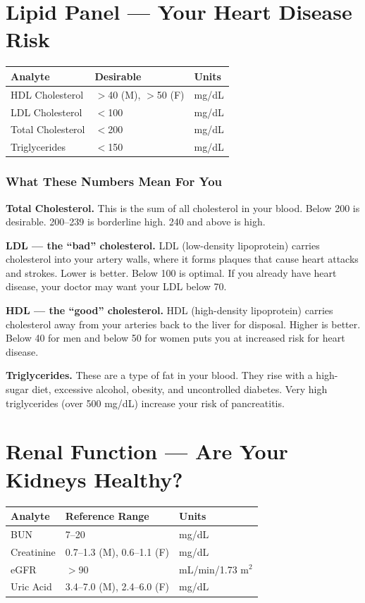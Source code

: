 \clearpage
\section{Lipid Panel --- Your Heart Disease Risk}

\begin{longtable}{@{}lll@{}}
\toprule
\textbf{Analyte} & \textbf{Desirable} & \textbf{Units} \\
\midrule
HDL Cholesterol & $>$40 (M), $>$50 (F) & mg/dL \\
LDL Cholesterol & $<$100 & mg/dL \\
Total Cholesterol & $<$200 & mg/dL \\
Triglycerides & $<$150 & mg/dL \\
\bottomrule
\end{longtable}

\subsubsection{What These Numbers Mean For You}

\textbf{Total Cholesterol.} This is the sum of all cholesterol in your blood. Below 200 is desirable. 200--239 is borderline high. 240 and above is high.

\textbf{LDL --- the ``bad'' cholesterol.} LDL (low-density lipoprotein) carries cholesterol into your artery walls, where it forms plaques that cause heart attacks and strokes. Lower is better. Below 100 is optimal. If you already have heart disease, your doctor may want your LDL below 70.

\textbf{HDL --- the ``good'' cholesterol.} HDL (high-density lipoprotein) carries cholesterol away from your arteries back to the liver for disposal. Higher is better. Below 40 for men and below 50 for women puts you at increased risk for heart disease.

\textbf{Triglycerides.} These are a type of fat in your blood. They rise with a high-sugar diet, excessive alcohol, obesity, and uncontrolled diabetes. Very high triglycerides (over 500 mg/dL) increase your risk of pancreatitis.

\clearpage
\section{Renal Function --- Are Your Kidneys Healthy?}

\begin{longtable}{@{}lll@{}}
\toprule
\textbf{Analyte} & \textbf{Reference Range} & \textbf{Units} \\
\midrule
BUN & 7--20 & mg/dL \\
Creatinine & 0.7--1.3 (M), 0.6--1.1 (F) & mg/dL \\
eGFR & $>$90 & mL/min/1.73 m$^2$ \\
Uric Acid & 3.4--7.0 (M), 2.4--6.0 (F) & mg/dL \\
\bottomrule
\end{longtable}

